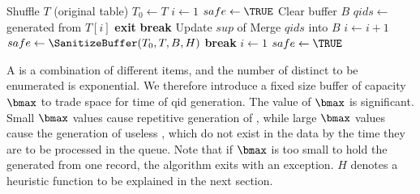 \begin{algorithm}[h]
\small
\caption{$\PartialSuppression(T,\bmax)$}
\label{algo:partialsuppression}
\begin{algorithmic}[1]
\STATE Shuffle $T$ (original table)
\STATE $T_0 \gets T$ %
\STATE $i\leftarrow 1$
\STATE $safe \leftarrow \TRUE$
    \LOOP
        \STATE Clear buffer $B$
         \label{algo:enu_s}
            \STATE $qids \gets$ \qids generated from $T[i]$
		\STATE \textbf{exit}
                \STATE \textbf{break}
            \ELSE
	     \STATE Update $sup$ of \qids \label{algo:enumerate2}
             \STATE Merge $qids$ into $B$ \label{algo:enumerate1}
             \STATE $i\leftarrow i+1$
            \ENDIF
        \ENDWHILE \label{algo:enu_e}
        \STATE $safe \leftarrow \SanitizeBuffer(T_0, T, B, H)$\label{line:sanitizebuffer}
                \STATE \textbf{break}\label{algo:partialbreak}
            \ELSE
                \STATE $i\leftarrow 1$
                \STATE $safe\leftarrow\TRUE$
            \ENDIF
        \ENDIF
    \ENDLOOP
\end{algorithmic}
\end{algorithm}

A \qid is a combination of different items,
and the number of distinct \qids to be enumerated is exponential.
We therefore introduce a fixed size \qid buffer of
capacity $\bmax$ to trade space for time of qid generation.
The value of $\bmax$ is significant. Small $\bmax$ values cause
repetitive generation of \qids, while large $\bmax$ values cause the generation
of useless \qids, which do not exist in the data
by the time they are to be processed in the queue. 
Note that if $\bmax$ is too small to hold the \qids generated from one
record, the algorithm exits with an exception.
$H$ denotes a heuristic function to be explained 
in the next section.

